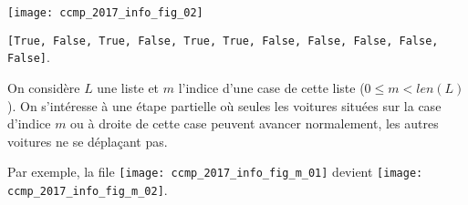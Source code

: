 \ifprof
\else
\begin{center}
	\texttt{[image: ccmp\_2017\_info\_fig\_02]}
\end{center}
\fi

\ifprof
\begin{corrige}
\lstinline{[True, False, True, False, True, True, False, False, False, False, False]}.
\end{corrige}
\else
\fi


\ifprof
\else
On considère $L$ une liste et $m$ l'indice d'une case de cette liste ($0 \leqslant m < len(L)$). On
s'intéresse à une étape partielle où seules les voitures situées sur la case d'indice $m$ ou à droite de
cette case peuvent avancer normalement, les autres voitures ne se déplaçant pas.


Par exemple, la file  \texttt{[image: ccmp\_2017\_info\_fig\_m\_01]}
 devient \texttt{[image: ccmp\_2017\_info\_fig\_m\_02]}.



\fi



